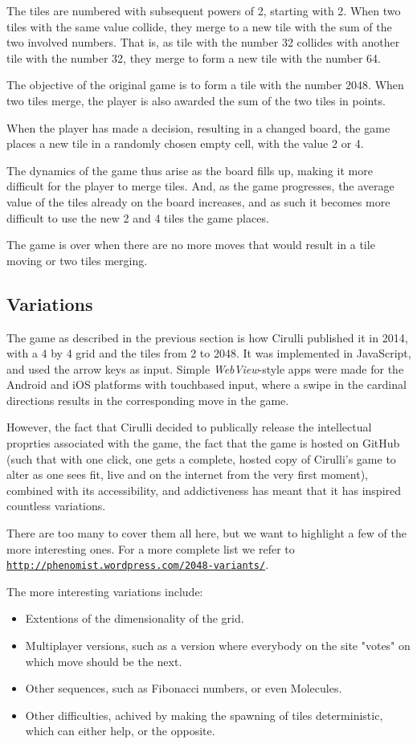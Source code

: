 \documentclass[a4paper, 12pt]{article}
\newcommand{\link}[1]{\href{http://#1}{\texttt{#1}}}
\begin{document}
The tiles are numbered with subsequent powers of 2, starting with
2. When two tiles with the same value collide, they merge to a new
tile with the sum of the two involved numbers. That is, as tile with
the number 32 collides with another tile with the number 32, they
merge to form a new tile with the number 64.

The objective of the original game is to form a tile with the number 2048. When
two tiles merge, the player is also awarded the sum of the two tiles
in points.

When the player has made a decision, resulting in a changed board, the game places a new tile in a randomly
chosen empty cell, with the value 2 or 4.

The dynamics of the game thus arise as the board fills up, making it
more difficult for the player to merge tiles. And, as the game
progresses, the average value of the tiles already on the board
increases, and as such it becomes more difficult to use the new 2 and
4 tiles the game places.

The game is over when there are no more moves that would result in a
tile moving or two tiles merging.

\subsection{Variations}

The game as described in the previous section is how Cirulli published
it in 2014, with a 4 by 4 grid and the tiles from 2 to 2048. It was
implemented in JavaScript, and used the arrow keys as input. Simple
\emph{WebView}-style apps were made for the Android and iOS platforms
with touchbased input, where a swipe in the cardinal directions
results in the corresponding move in the game.

However, the fact that Cirulli decided to publically release the
intellectual proprties associated with the game, the fact that the
game is hosted on GitHub (such that with one click, one gets a
complete, hosted copy of Cirulli's game to alter as one sees fit, live
and on the internet from the very first moment), combined with its
accessibility, and addictiveness has meant that it has inspired countless variations.

There are too many to cover them all here, but we want to highlight a few of the more interesting ones. For a more complete list we refer to \link{http://phenomist.wordpress.com/2048-variants/}.

The more interesting variations include:
\begin{itemize}
\item Extentions of the dimensionality of the grid.
\item Multiplayer versions, such as a version where everybody on the site "votes" on which move should be the next.
\item Other sequences, such as Fibonacci numbers, or even Molecules.
\item Other difficulties, achived by making the spawning of tiles deterministic, which can either help, or the opposite.
\end{itemize}
\end{document}
